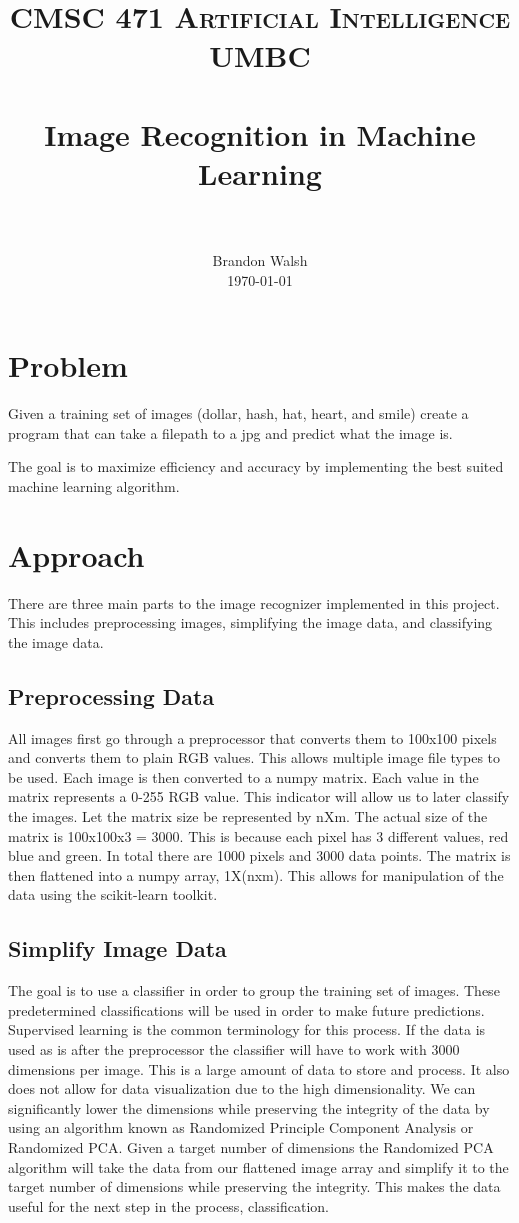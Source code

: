 \documentclass[paper=a4, fontsize=12pt]{scrartcl}
\title{
		\usefont{OT1}{bch}{b}{n}
		\normalfont \normalsize \textsc{CMSC 471 Artificial Intelligence UMBC} \\ [25pt]
		\horrule{0.5pt} \\[0.4cm]
		\huge Image Recognition in Machine Learning \\
		\horrule{2pt} \\[0.5cm]
}
\author{
		\normalfont 								\normalsize
        Brandon Walsh\\[-3pt]		\normalsize
        \today
}
\date{}
\numberwithin{equation}{section}		%
\numberwithin{figure}{section}			%
\numberwithin{table}{section}				%
\begin{document}
\maketitle
\section{Problem}
Given a training set of images (dollar, hash, hat, heart, and smile) create a program that can take a filepath to a jpg and predict what the image is.

The goal is to maximize efficiency and accuracy by implementing the best suited machine learning algorithm.


\section{Approach}
There are three main parts to the image recognizer implemented in this project. This includes preprocessing images, simplifying the image data, and classifying the image data.

\subsection{Preprocessing Data}

All images first go through a preprocessor that converts them to 100x100 pixels and converts them to plain RGB values. This allows multiple image file types to be used. Each image is then converted to a numpy matrix. Each value in the matrix represents a 0-255 RGB value. This indicator will allow us to later classify the images. Let the matrix size be represented by nXm. The actual size of the matrix is 100x100x3 = 3000. This is because each pixel has 3 different values, red blue and green. In total there are 1000 pixels and 3000 data points. The matrix is then flattened into a numpy array, 1X(nxm). This allows for manipulation of the data using the scikit-learn toolkit.


\subsection{Simplify Image Data}
The goal is to use a classifier in order to group the training set of images. These predetermined classifications will be used in order to make future predictions. Supervised learning is the common terminology for this process. If the data is used as is after the preprocessor the classifier will have to work with 3000 dimensions per image. This is a large amount of data to store and process. It also does not allow for data visualization due to the high dimensionality.
We can significantly lower the dimensions while preserving the integrity of the data by using an algorithm known as Randomized Principle Component Analysis or Randomized PCA. Given a target number of dimensions the Randomized PCA algorithm will take the data from our flattened image array and simplify it to the target number of dimensions while preserving the integrity. This makes the data useful for the next step in the process, classification.
\end{document}
